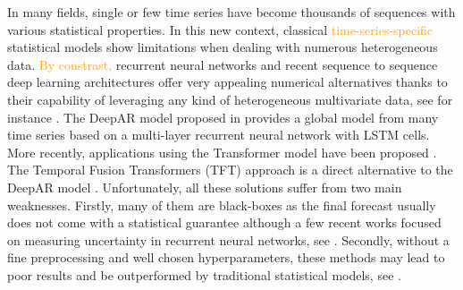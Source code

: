 \documentclass[10pt]{article} %
\begin{document}
In many fields, single or few time series have become thousands of sequences with various statistical properties. In this new context, classical \textcolor{orange}{time-series-specific} statistical models show limitations when dealing with numerous heterogeneous data. \textcolor{orange}{By constrast,} recurrent neural networks and recent sequence to sequence deep learning architectures offer very appealing numerical alternatives thanks to their capability of leveraging any kind of heterogeneous multivariate data, see for instance \citet{ hochreiter1997,vaswani2017, siami2018, li2019, lim2019,salinas2020}. The DeepAR model proposed in \citet{salinas2020} provides a global model from many time series based on a multi-layer recurrent neural network with LSTM cells. More recently, applications using the Transformer model have been proposed  \citep{li2019}. The Temporal Fusion Transformers (TFT) approach is a direct alternative to the DeepAR model \citep{lim2019}.  Unfortunately, all these solutions suffer from two main weaknesses. Firstly, many of them are black-boxes  as the final forecast usually does not come with a statistical guarantee  although a few recent works focused on measuring uncertainty in recurrent neural networks, see  \citet{martin2020}. Secondly, without a fine preprocessing and well chosen hyperparameters, these methods may lead to poor results and be outperformed by traditional statistical models, see \citet{makridakis2018}.
\end{document}
